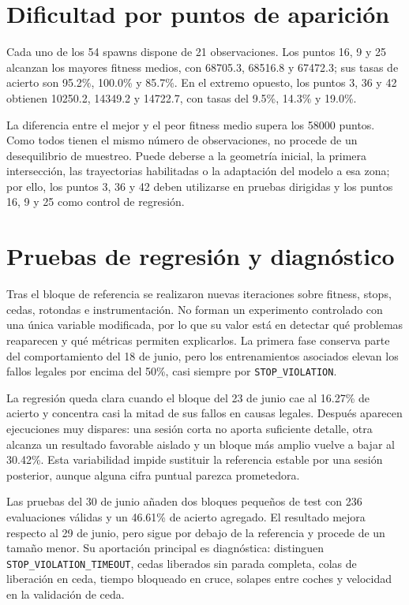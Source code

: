 \section{Dificultad por puntos de aparición}

Cada uno de los 54 spawns dispone de 21 observaciones. Los puntos 16, 9 y 25 alcanzan los mayores fitness medios, con 68705.3, 68516.8 y 67472.3; sus tasas de acierto son 95.2\%, 100.0\% y 85.7\%. En el extremo opuesto, los puntos 3, 36 y 42 obtienen 10250.2, 14349.2 y 14722.7, con tasas del 9.5\%, 14.3\% y 19.0\%.

La diferencia entre el mejor y el peor fitness medio supera los 58000 puntos. Como todos tienen el mismo número de observaciones, no procede de un desequilibrio de muestreo. Puede deberse a la geometría inicial, la primera intersección, las trayectorias habilitadas o la adaptación del modelo a esa zona; por ello, los puntos 3, 36 y 42 deben utilizarse en pruebas dirigidas y los puntos 16, 9 y 25 como control de regresión.

\section{Pruebas de regresión y diagnóstico}

Tras el bloque de referencia se realizaron nuevas iteraciones sobre fitness, stops, cedas, rotondas e instrumentación. No forman un experimento controlado con una única variable modificada, por lo que su valor está en detectar qué problemas reaparecen y qué métricas permiten explicarlos. La primera fase conserva parte del comportamiento del 18 de junio, pero los entrenamientos asociados elevan los fallos legales por encima del 50\%, casi siempre por \texttt{STOP\_VIOLATION}.

La regresión queda clara cuando el bloque del 23 de junio cae al 16.27\% de acierto y concentra casi la mitad de sus fallos en causas legales. Después aparecen ejecuciones muy dispares: una sesión corta no aporta suficiente detalle, otra alcanza un resultado favorable aislado y un bloque más amplio vuelve a bajar al 30.42\%. Esta variabilidad impide sustituir la referencia estable por una sesión posterior, aunque alguna cifra puntual parezca prometedora.

Las pruebas del 30 de junio añaden dos bloques pequeños de test con 236 evaluaciones válidas y un 46.61\% de acierto agregado. El resultado mejora respecto al 29 de junio, pero sigue por debajo de la referencia y procede de un tamaño menor. Su aportación principal es diagnóstica: distinguen \texttt{STOP\_VIOLATION\_TIMEOUT}, cedas liberados sin parada completa, colas de liberación en ceda, tiempo bloqueado en cruce, solapes entre coches y velocidad en la validación de ceda.

